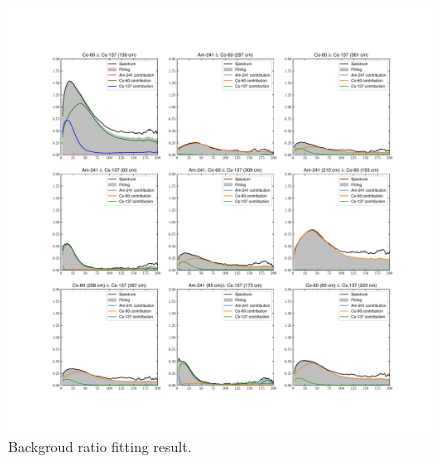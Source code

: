 \documentclass[10pt]{wlscirep}
\begin{document}
\begin{figure}[ht]
\centering
\includegraphics[width=\linewidth]{figure/fit_BGRto.pdf}
\caption{Backgroud ratio fitting result.}
\label{fig:fi_fitbfrto}
\end{figure}
\end{document}

